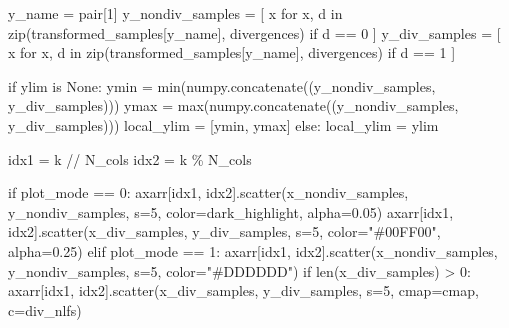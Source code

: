 \documentclass[
  letterpaper,
  DIV=11,
  numbers=noendperiod]{scrartcl}
\newenvironment{Shaded}{\begin{snugshade}}{\end{snugshade}}
\newcommand{\BuiltInTok}[1]{\textcolor[rgb]{0.00,0.23,0.31}{#1}}
\newcommand{\ControlFlowTok}[1]{\textcolor[rgb]{0.00,0.23,0.31}{#1}}
\newcommand{\DecValTok}[1]{\textcolor[rgb]{0.68,0.00,0.00}{#1}}
\newcommand{\FloatTok}[1]{\textcolor[rgb]{0.68,0.00,0.00}{#1}}
\newcommand{\KeywordTok}[1]{\textcolor[rgb]{0.00,0.23,0.31}{#1}}
\newcommand{\NormalTok}[1]{\textcolor[rgb]{0.00,0.23,0.31}{#1}}
\newcommand{\OperatorTok}[1]{\textcolor[rgb]{0.37,0.37,0.37}{#1}}
\newcommand{\StringTok}[1]{\textcolor[rgb]{0.13,0.47,0.30}{#1}}
\newcommand{\VariableTok}[1]{\textcolor[rgb]{0.07,0.07,0.07}{#1}}
\begin{document}
\begin{Shaded}
\begin{Highlighting}[]
\NormalTok{    y\_name }\OperatorTok{=}\NormalTok{ pair[}\DecValTok{1}\NormalTok{]}
\NormalTok{    y\_nondiv\_samples }\OperatorTok{=}\NormalTok{ [ x }\ControlFlowTok{for}\NormalTok{ x, d }\KeywordTok{in} 
                         \BuiltInTok{zip}\NormalTok{(transformed\_samples[y\_name], divergences) }
                         \ControlFlowTok{if}\NormalTok{ d }\OperatorTok{==} \DecValTok{0}\NormalTok{  ]}
\NormalTok{    y\_div\_samples    }\OperatorTok{=}\NormalTok{ [ x }\ControlFlowTok{for}\NormalTok{ x, d }\KeywordTok{in} 
                         \BuiltInTok{zip}\NormalTok{(transformed\_samples[y\_name], divergences) }
                         \ControlFlowTok{if}\NormalTok{ d }\OperatorTok{==} \DecValTok{1}\NormalTok{  ]}
    
    \ControlFlowTok{if}\NormalTok{ ylim }\KeywordTok{is} \VariableTok{None}\NormalTok{:}
\NormalTok{      ymin }\OperatorTok{=} \BuiltInTok{min}\NormalTok{(numpy.concatenate((y\_nondiv\_samples, y\_div\_samples)))}
\NormalTok{      ymax }\OperatorTok{=} \BuiltInTok{max}\NormalTok{(numpy.concatenate((y\_nondiv\_samples, y\_div\_samples)))}
\NormalTok{      local\_ylim }\OperatorTok{=}\NormalTok{ [ymin, ymax]}
    \ControlFlowTok{else}\NormalTok{:}
\NormalTok{      local\_ylim }\OperatorTok{=}\NormalTok{ ylim}
     
\NormalTok{    idx1 }\OperatorTok{=}\NormalTok{ k }\OperatorTok{//}\NormalTok{ N\_cols}
\NormalTok{    idx2 }\OperatorTok{=}\NormalTok{ k }\OperatorTok{\%}\NormalTok{ N\_cols}
    
    \ControlFlowTok{if}\NormalTok{ plot\_mode }\OperatorTok{==} \DecValTok{0}\NormalTok{:}
\NormalTok{      axarr[idx1, idx2].scatter(x\_nondiv\_samples, y\_nondiv\_samples, s}\OperatorTok{=}\DecValTok{5}\NormalTok{,}
\NormalTok{                                color}\OperatorTok{=}\NormalTok{dark\_highlight, alpha}\OperatorTok{=}\FloatTok{0.05}\NormalTok{)}
\NormalTok{      axarr[idx1, idx2].scatter(x\_div\_samples, y\_div\_samples, s}\OperatorTok{=}\DecValTok{5}\NormalTok{,}
\NormalTok{                                color}\OperatorTok{=}\StringTok{"\#00FF00"}\NormalTok{, alpha}\OperatorTok{=}\FloatTok{0.25}\NormalTok{)}
    \ControlFlowTok{elif}\NormalTok{ plot\_mode }\OperatorTok{==} \DecValTok{1}\NormalTok{:}
\NormalTok{      axarr[idx1, idx2].scatter(x\_nondiv\_samples, y\_nondiv\_samples, }
\NormalTok{                                s}\OperatorTok{=}\DecValTok{5}\NormalTok{, color}\OperatorTok{=}\StringTok{"\#DDDDDD"}\NormalTok{)}
      \ControlFlowTok{if} \BuiltInTok{len}\NormalTok{(x\_div\_samples) }\OperatorTok{\textgreater{}} \DecValTok{0}\NormalTok{:}
\NormalTok{        axarr[idx1, idx2].scatter(x\_div\_samples, y\_div\_samples, s}\OperatorTok{=}\DecValTok{5}\NormalTok{,}
\NormalTok{                                  cmap}\OperatorTok{=}\NormalTok{cmap, c}\OperatorTok{=}\NormalTok{div\_nlfs)}
                                

\end{Highlighting}
\end{Shaded}
\end{document}
